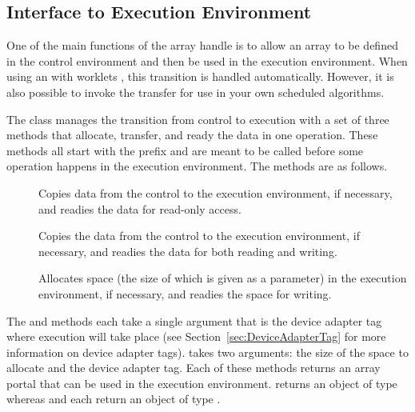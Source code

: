 
\subsection{Interface to Execution Environment}
\label{sec:ArrayHandleInterfaceToExecutionEnvironment}

One of the main functions of the array handle is to allow an array to be
defined in the control environment and then be used in the execution
environment. When using an  with worklets
, this transition is handled automatically. However, it is
also possible to invoke the transfer for use in your own scheduled
algorithms.

The  class manages the transition from control
to execution with a set of three methods that allocate, transfer, and ready
the data in one operation. These methods all start with the prefix
 and are meant to be called before some operation happens
in the execution environment. The methods are as follows.

\begin{description}
\item[]  Copies data from
  the control to the execution environment, if necessary, and readies the
  data for read-only access.
\item[]  Copies the
  data from the control to the execution environment, if necessary, and
  readies the data for both reading and writing.
\item[]  Allocates space
  (the size of which is given as a parameter) in the execution environment,
  if necessary, and readies the space for writing.
\end{description}

The  and  methods
each take a single argument that is the device adapter tag where execution
will take place (see Section~\ref{sec:DeviceAdapterTag} for more
information on device adapter tags).  takes two
arguments: the size of the space to allocate and the device adapter tag.
Each of these methods returns an array portal that can be used in the
execution environment.  returns an object of type
whereas  and  each
return an object of type
.

